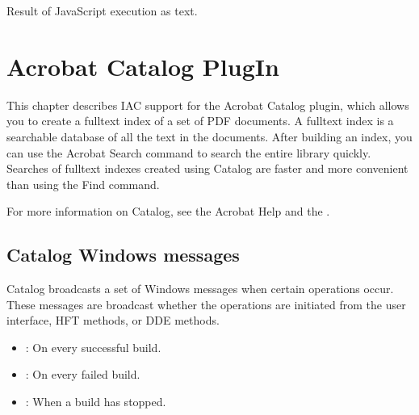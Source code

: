 \documentclass[letterpaper,12pt,english,openany,oneside]{sphinxmanual}
\begin{document}
Result of JavaScript execution as text.

\label{\detokenize{IAC_API_AppleEvtObjects:applescript-example-37}}

\begin{sphinxVerbatim}[commandchars=\\\{\}]
  
\end{sphinxVerbatim}


\chapter{Acrobat Catalog Plug\sphinxhyphen{}In}
\label{\detokenize{IAC_API_CatalogCatIntro:acrobat-catalog-plug-in}}\label{\detokenize{IAC_API_CatalogCatIntro::doc}}
This chapter describes IAC support for the Acrobat Catalog plug\sphinxhyphen{}in, which allows you to create a full\sphinxhyphen{}text index of a set of PDF documents. A full\sphinxhyphen{}text index is a searchable database of all the text in the documents. After building an index, you can use the Acrobat Search command to search the entire library quickly. Searches of full\sphinxhyphen{}text indexes created using Catalog are faster and more convenient than using the Find command.

For more information on Catalog, see the Acrobat Help and the  .


\section{Catalog Windows messages}
\label{\detokenize{IAC_API_CatalogCatIntro:catalog-windows-messages}}
Catalog broadcasts a set of Windows messages when certain operations occur. These messages are broadcast whether the operations are initiated from the user interface, HFT methods, or DDE methods.
\begin{itemize}
\item {} 
: On every successful build.

\item {} 
: On every failed build.

\item {} 
: When a build has stopped.

\end{itemize}
\end{document}
